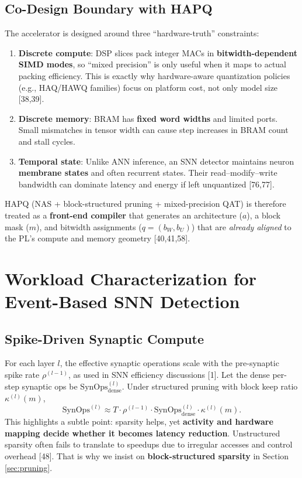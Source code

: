 \documentclass[10pt,journal,compsoc]{IEEEtran}
\newcommand{\SynOps}{\text{SynOps}}
\begin{document}
\subsection{Co-Design Boundary with HAPQ}
The accelerator is designed around three ``hardware-truth'' constraints:
\begin{enumerate}
    \item \textbf{Discrete compute}: DSP slices pack integer MACs in \textbf{bitwidth-dependent SIMD modes}, so ``mixed precision'' is only useful when it maps to actual packing efficiency. This is exactly why hardware-aware quantization policies (e.g., HAQ/HAWQ families) focus on platform cost, not only model size [38,39].
    \item \textbf{Discrete memory}: BRAM has \textbf{fixed word widths} and limited ports. Small mismatches in tensor width can cause step increases in BRAM count and stall cycles.
    \item \textbf{Temporal state}: Unlike ANN inference, an SNN detector maintains neuron \textbf{membrane states} and often recurrent states. Their read--modify--write bandwidth can dominate latency and energy if left unquantized [76,77].
\end{enumerate}
HAPQ (NAS + block-structured pruning + mixed-precision QAT) is therefore treated as a \textbf{front-end compiler} that generates an architecture ($a$), a block mask ($m$), and bitwidth assignments ($q=(b_W,b_U)$) that are \textit{already aligned} to the PL's compute and memory geometry [40,41,58].

\section{Workload Characterization for Event-Based SNN Detection}

\subsection{Spike-Driven Synaptic Compute}
For each layer $l$, the effective synaptic operations scale with the pre-synaptic spike rate $\rho^{(l-1)}$, as used in SNN efficiency discussions [1]. Let the dense per-step synaptic ops be $\SynOps^{(l)}_{\text{dense}}$. Under structured pruning with block keep ratio $\kappa^{(l)}(m)$,
\begin{equation}
\SynOps^{(l)} \approx T \cdot \rho^{(l-1)} \cdot \SynOps^{(l)}_{\text{dense}} \cdot \kappa^{(l)}(m).
\end{equation}
This highlights a subtle point: sparsity helps, yet \textbf{activity and hardware mapping decide whether it becomes latency reduction}. Unstructured sparsity often fails to translate to speedups due to irregular accesses and control overhead [48]. That is why we insist on \textbf{block-structured sparsity} in Section \ref{sec:pruning}.
\end{document}
